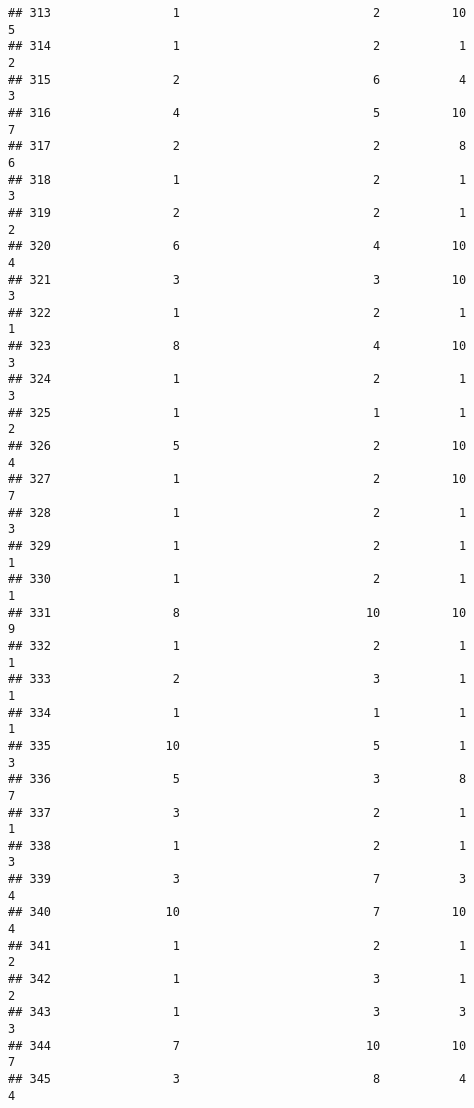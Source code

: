 \documentclass[
]{article}
\begin{document}
\begin{verbatim}
## 313                 1                           2          10               5
## 314                 1                           2           1               2
## 315                 2                           6           4               3
## 316                 4                           5          10               7
## 317                 2                           2           8               6
## 318                 1                           2           1               3
## 319                 2                           2           1               2
## 320                 6                           4          10               4
## 321                 3                           3          10               3
## 322                 1                           2           1               1
## 323                 8                           4          10               3
## 324                 1                           2           1               3
## 325                 1                           1           1               2
## 326                 5                           2          10               4
## 327                 1                           2          10               7
## 328                 1                           2           1               3
## 329                 1                           2           1               1
## 330                 1                           2           1               1
## 331                 8                          10          10               9
## 332                 1                           2           1               1
## 333                 2                           3           1               1
## 334                 1                           1           1               1
## 335                10                           5           1               3
## 336                 5                           3           8               7
## 337                 3                           2           1               1
## 338                 1                           2           1               3
## 339                 3                           7           3               4
## 340                10                           7          10               4
## 341                 1                           2           1               2
## 342                 1                           3           1               2
## 343                 1                           3           3               3
## 344                 7                          10          10               7
## 345                 3                           8           4               4

\end{verbatim}
\end{document}
